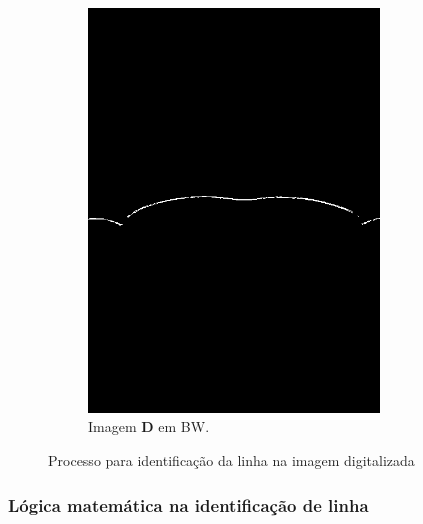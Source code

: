 \documentclass[a4paper, 12pt]{article}
\begin{document}
\begin{figure}[!h]
\begin{subfigure}[b]{0.35\textwidth}
         \includegraphics[width=0.85\textwidth]{grayscale.jpg}
         \caption{Imagem $\mathbf{D}$ em BW.}
         \label{fig:cordetect:bw}
     \end{subfigure}
\caption{Processo para identificação da linha na imagem digitalizada}
\label{fig:cordetect}
\end{figure}

\subsubsection{Lógica matemática na identificação de linha}
\end{document}

